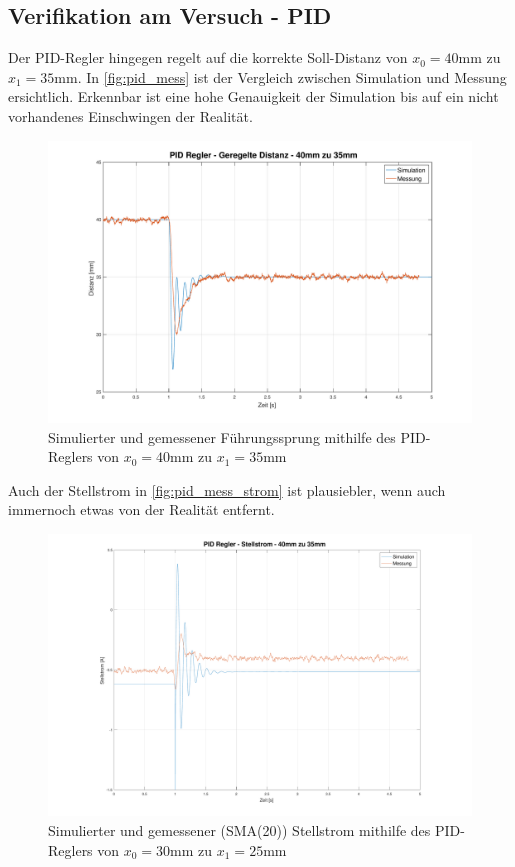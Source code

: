 \newpage 
	\subsection*{Verifikation am Versuch - PID}
	Der PID-Regler hingegen regelt auf die korrekte Soll-Distanz von $x_0 = 40\si{\milli\meter}$ zu $x_1 = 35\si{\milli\meter}$. In \autoref{fig:pid_mess} ist der Vergleich zwischen Simulation und Messung ersichtlich. Erkennbar ist eine hohe Genauigkeit der Simulation bis auf ein nicht vorhandenes Einschwingen der Realität.
			
		\begin{figure}[H]
				\centering
				\includegraphics[width=\textwidth]{./figure/PiD_mess_distanz_40mm.pdf}
				\caption{Simulierter und gemessener Führungssprung mithilfe des PID-Reglers von $x_0 = 40\si{\milli\meter}$ zu $x_1 = 35\si{\milli\meter}$}
				\label{fig:pid_mess}
			\end{figure}
		Auch der Stellstrom in \autoref{fig:pid_mess_strom} ist plausiebler, wenn auch immernoch etwas von der Realität entfernt.
			\begin{figure}[H]
				\centering
				\includegraphics[width=\textwidth]{./figure/PID_mess_stellstrom_40mm.pdf}
				\caption{Simulierter und gemessener (SMA(20)) Stellstrom mithilfe des PID-Reglers von $x_0 = 30\si{\milli\meter}$ zu $x_1 = 25\si{\milli\meter}$}
				\label{fig:pid_mess_strom}
			\end{figure}


